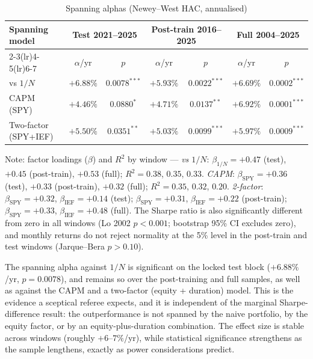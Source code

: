 \begin{table}[H]
\centering
\caption{Spanning alphas (Newey--West HAC, annualised)}
\label{tab:alpha}
\small
\begin{tabular}{lcccccc}
\toprule
Spanning model & \multicolumn{2}{c}{Test 2021--2025} & \multicolumn{2}{c}{Post-train 2016--2025} & \multicolumn{2}{c}{Full 2004--2025} \\
\cmidrule(lr){2-3}\cmidrule(lr){4-5}\cmidrule(lr){6-7}
& $\alpha$/yr & $p$ & $\alpha$/yr & $p$ & $\alpha$/yr & $p$ \\
\midrule
vs $1/N$            & $+6.88\%$ & $0.0078^{***}$ & $+5.93\%$ & $0.0022^{***}$ & $+6.69\%$ & $0.0002^{***}$ \\
CAPM (SPY)          & $+4.46\%$ & $0.0880^{*}$   & $+4.71\%$ & $0.0137^{**}$  & $+6.92\%$ & $0.0001^{***}$ \\
Two-factor (SPY+IEF)& $+5.50\%$ & $0.0351^{**}$  & $+5.03\%$ & $0.0099^{***}$ & $+5.97\%$ & $0.0009^{***}$ \\
\bottomrule
\end{tabular}
\begin{flushleft}
\footnotesize
Note: factor loadings ($\beta$) and $R^2$ by window ---
\emph{vs $1/N$}: $\beta_{1/N}=+0.47$ (test), $+0.45$ (post-train), $+0.53$ (full);
$R^2=0.38$, $0.35$, $0.33$.
\emph{CAPM}: $\beta_{\text{SPY}}=+0.36$ (test), $+0.33$ (post-train), $+0.32$ (full);
$R^2=0.35$, $0.32$, $0.20$.
\emph{2-factor}: $\beta_{\text{SPY}}=+0.32$, $\beta_{\text{IEF}}=+0.14$ (test);
$\beta_{\text{SPY}}=+0.31$, $\beta_{\text{IEF}}=+0.22$ (post-train);
$\beta_{\text{SPY}}=+0.33$, $\beta_{\text{IEF}}=+0.48$ (full).
The Sharpe ratio is also significantly different from zero in all windows
(Lo 2002 $p<0.001$; bootstrap 95\% CI excludes zero), and monthly returns do not
reject normality at the 5\% level in the post-train and test windows
(Jarque--Bera $p>0.10$).
\end{flushleft}
\end{table}

The spanning alpha against $1/N$ is significant on the locked test block
($+6.88\%$/yr, $p = 0.0078$), and remains so over the post-training and full
samples, as well as against the CAPM and a two-factor (equity + duration) model.
This is the evidence a sceptical referee expects, and it is independent of the
marginal Sharpe-difference result: the outperformance is not spanned by the naive
portfolio, by the equity factor, or by an equity-plus-duration combination. The
effect size is stable across windows (roughly $+6$--$7\%$/yr), while statistical
significance strengthens as the sample lengthens, exactly as power considerations
predict.

